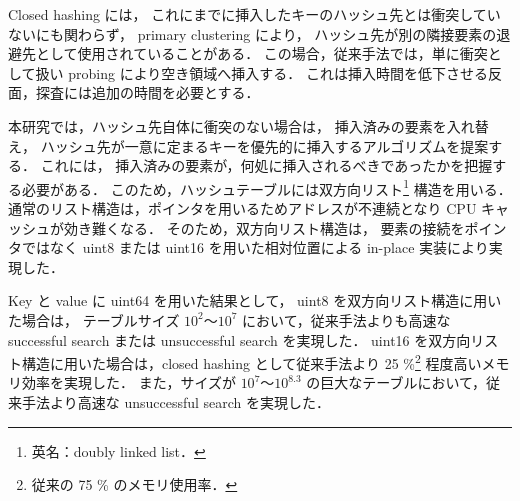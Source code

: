 Closed hashing には，
これにまでに挿入したキーのハッシュ先とは衝突していないにも関わらず，
primary clustering により，
ハッシュ先が別の隣接要素の退避先として使用されていることがある．
この場合，従来手法では，単に衝突として扱い probing により空き領域へ挿入する．
これは挿入時間を低下させる反面，探査には追加の時間を必要とする．

本研究では，ハッシュ先自体に衝突のない場合は，
挿入済みの要素を入れ替え，
ハッシュ先が一意に定まるキーを優先的に挿入するアルゴリズムを提案する．
これには，
挿入済みの要素が，何処に挿入されるべきであったかを把握する必要がある．
このため，ハッシュテーブルには双方向リスト\footnote{英名：doubly linked list．} 構造を用いる．
通常のリスト構造は，ポインタを用いるためアドレスが不連続となり CPU キャッシュが効き難くなる．
そのため，双方向リスト構造は，
要素の接続をポインタではなく uint8 または uint16 を用いた相対位置による in-place 実装により実現した．

Key と value に uint64 を用いた結果として，
uint8 を双方向リスト構造に用いた場合は，
テーブルサイズ $10^2〜10^{7}$ において，従来手法よりも高速な successful search または unsuccessful search を実現した．
uint16 を双方向リスト構造に用いた場合は，closed hashing として従来手法より 25 \%\footnote{従来の 75 \% のメモリ使用率．} 程度高いメモリ効率を実現した．
また，サイズが $10^7〜10^{8.3}$ の巨大なテーブルにおいて，従来手法より高速な unsuccessful search を実現した．

\newpage
\pagestyle{headings} %


